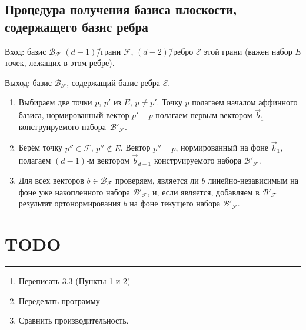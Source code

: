 \documentclass[a4paper,12pt]{article}
\newcommand{\Facet}{\mathcal{F}}              %
\newcommand{\Edge}{\mathcal{E}}               %
\newcommand{\Basis}{\mathcal{B}}              %
\renewcommand{\.}{\hspace{0.2ex}}
\begin{document}
  \subsection{Процедура получения базиса плоскости, содержащего базис ребра}
    Вход: базис $\Basis_{\Facet}$ $(d-1)$\=/грани $\Facet$, $(d-2)$\=/ребро $\Edge$ этой грани (важен набор $E$ точек, лежащих в этом ребре).

    Выход: базис $\Basis_{\Facet}$, содержащий базис ребра $\Edge$.
    \begin{enumerate}
      \item Выбираем две точки $p$, $p'$ из $E$, $p \neq p'$. Точку $p$ полагаем началом аффинного базиса, нормированный вектор $p'-p$ полагаем первым вектором $\vec b_1$ конструируемого набора~$\Basis'_{\Facet}$.
      \item Берём точку $p'' \in \Facet$, $p'' \notin E$. Вектор $p''-p$, нормированный на фоне $\vec b_1$, полагаем $(d-1)$-м вектором $\vec b_{d-1}$ конструируемого набора $\Basis'_{\Facet}$.
      \item Для всех векторов $b \in \Basis_{\Facet}$ проверяем, является ли $b$ линейно-независимым на фоне уже накопленного набора $\Basis'_{\Facet}$, и, если является, добавляем в $\Basis'_{\Facet}$ результат ортонормирования $b$ на фоне текущего набора $\Basis'_{\Facet}$.
    \end{enumerate}


\section{TODO}

  \hrule

  \begin{enumerate}
    \item Переписать 3.3 (Пункты 1 и 2)
    \item Переделать программу
    \item Сравнить производительность.
  \end{enumerate}
\end{document}
